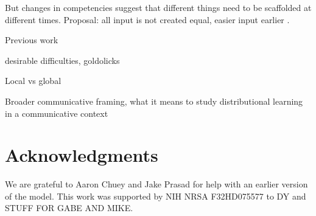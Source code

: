 \documentclass[10pt,letterpaper]{article}
\begin{document}
%

But changes in competencies suggest that different things need to be scaffolded at different times. Proposal: all input is not created equal, easier input earlier \cite{elman1993, fausey2016}.

Previous work \cite{sokolov1993,dale2006}

desirable difficulties, goldolicks

Local vs global \cite{onnis2008, goldstein2010}

Broader communicative framing, what it means to study distributional learning in a communicative context



\section{Acknowledgments}

We are grateful to Aaron Chuey and Jake Prasad for help with an earlier version of the model. This work was supported by NIH NRSA F32HD075577 to DY and STUFF FOR GABE AND MIKE.



\setlength{\bibleftmargin}{.125in}
\setlength{\bibindent}{-\bibleftmargin}


\end{document}
